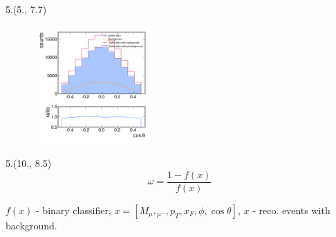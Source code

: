 \documentclass[10pt, xcolor={dvipsnames}, sans, mathserif, aspectratio=169]{beamer}
\newenvironment{Pic}[2]
{\begin{textblock}{#1}#2
\begin{figure}}
{\end{figure}
\end{textblock}}
\begin{document}
\begin{frame}
\begin{Pic}{5.}{(5., 7.7)}
	\includegraphics[width=4.5cm]{bs_costh.png}
\end{Pic}

\begin{textblock}{5.}(10., 8.5)
\begin{equation*}
	\omega = \frac{1 - f(x)}{f(x)}
\end{equation*}

$f(x)$ - binary classifier,  $x = [M_{\mu^{+}\mu^{-}}, p_{T}, x_{F}, \phi, \cos\theta]$, 
$x$ - reco. events with background. \\
\end{textblock}
\end{frame}
\end{document}
